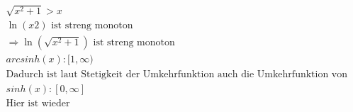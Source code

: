\documentclass{HM}
\begin{document}
\begin{enumerate}
\begin{enumerate}
	\begin{align*}
		\sqrt{x^2+1} > x\\
		\ln(x2) \text{ ist streng monoton}\\
		\Rightarrow \ln(\sqrt{x^2+1})\text{ ist streng monoton}\\
		arcsinh(x):[1,\infty)\\
		\text{Dadurch ist laut Stetigkeit der Umkehrfunktion auch die Umkehrfunktion von arcshin(x) stetig und streng monoton}\\
		sinh(x): [0,\infty]\\
		\text{Hier ist wieder }
	\end{align*}
	
\end{enumerate}


\end{enumerate}
\end{document}
